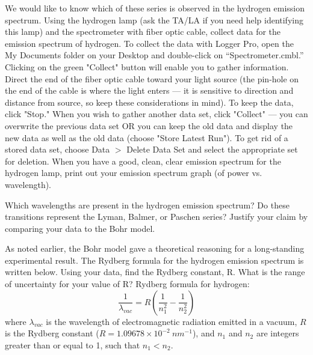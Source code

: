 \par
We would like to know which of these series is observed in the hydrogen emission spectrum.
Using the hydrogen lamp (ask the TA/LA if you need help identifying this lamp) and the spectrometer with fiber optic cable, collect data for the emission spectrum of hydrogen. 
To collect the data with Logger Pro, open the My Documents folder on your Desktop and double-click on “Spectrometer.cmbl.” 
Clicking on the green "Collect" button will enable you to gather information.
Direct the end of the fiber optic cable toward your light source (the pin-hole on the end of the cable is where the light enters — it is sensitive to direction and distance from source, so keep these considerations in mind). 
To keep the data, click "Stop." 
When you wish to gather another data set, click "Collect" — you can overwrite the previous data set OR you can keep the old data and display the new data as well as the old data (choose "Store Latest Run"). 
To get rid of a stored data set, choose Data $>$ Delete Data Set and select the appropriate set for deletion. 
When you have a good, clean, clear emission spectrum for the hydrogen lamp, print out your emission spectrum graph (of power vs. wavelength).
\par 
Which wavelengths are present in the hydrogen emission spectrum? 
Do these transitions represent the Lyman, Balmer, or Paschen series? 
Justify your claim by comparing your data to the Bohr model. 
\par 
As noted earlier, the Bohr model gave a theoretical reasoning for a long-standing experimental result. 
The Rydberg formula for the hydrogen emission spectrum is written below. 
Using your data, find the Rydberg constant, R. 
What is the range of uncertainty for your value of R?
\noindent
Rydberg formula for hydrogen:
\[ \frac{1}{\lambda_{vac}} = R \left( \frac{1}{n_{1}^{2}} - \frac{1}{n_{2}^{2}} \right) \]
where $ \lambda_{vac} $ is the wavelength of electromagnetic radiation emitted in a vacuum, $R$ is the Rydberg constant ($R = 1.09678\times 10^{-2} \: nm^{-1}$), and $n_{1}$ and $n_{2}$ are integers greater than or equal to 1, such that $n_{1} < n_{2}$.

